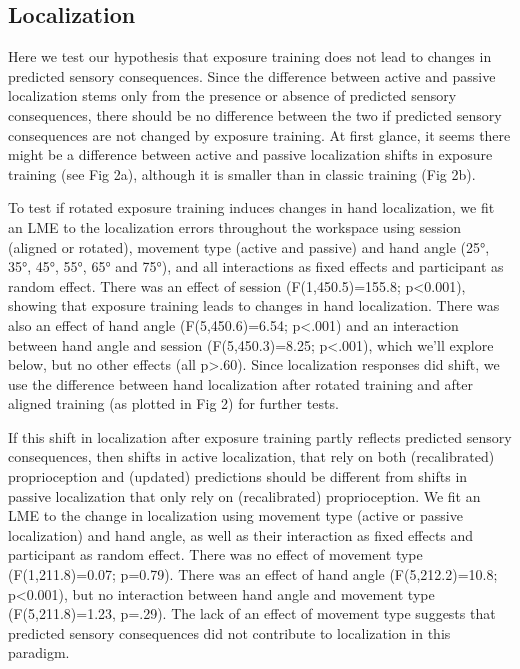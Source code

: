 \documentclass[10pt,letterpaper]{article}
\begin{document}
\subsection{Localization}\label{localization-2}

Here we test our hypothesis that exposure training does not lead to
changes in predicted sensory consequences. Since the difference between
active and passive localization stems only from the presence or absence
of predicted sensory consequences, there should be no difference between
the two if predicted sensory consequences are not changed by exposure
training. At first glance, it seems there might be a difference between
active and passive localization shifts in exposure training (see Fig
2a), although it is smaller than in classic training (Fig 2b).

To test if rotated exposure training induces changes in hand
localization, we fit an LME to the localization errors throughout the
workspace using session (aligned or rotated), movement type (active and
passive) and hand angle (25°, 35°, 45°, 55°, 65° and 75°), and all
interactions as fixed effects and participant as random effect. There
was an effect of session (F(1,450.5)=155.8; p\textless{}0.001), showing
that exposure training leads to changes in hand localization. There was
also an effect of hand angle (F(5,450.6)=6.54; p\textless{}.001) and an
interaction between hand angle and session (F(5,450.3)=8.25;
p\textless{}.001), which we'll explore below, but no other effects (all
p\textgreater{}.60). Since localization responses did shift, we use the
difference between hand localization after rotated training and after
aligned training (as plotted in Fig 2) for further tests.

If this shift in localization after exposure training partly reflects
predicted sensory consequences, then shifts in active localization, that
rely on both (recalibrated) proprioception and (updated) predictions
should be different from shifts in passive localization that only rely
on (recalibrated) proprioception. We fit an LME to the change in
localization using movement type (active or passive localization) and
hand angle, as well as their interaction as fixed effects and
participant as random effect. There was no effect of movement type
(F(1,211.8)=0.07; p=0.79). There was an effect of hand angle
(F(5,212.2)=10.8; p\textless{}0.001), but no interaction between hand
angle and movement type (F(5,211.8)=1.23, p=.29). The lack of an effect
of movement type suggests that predicted sensory consequences did not
contribute to localization in this paradigm.
\end{document}
